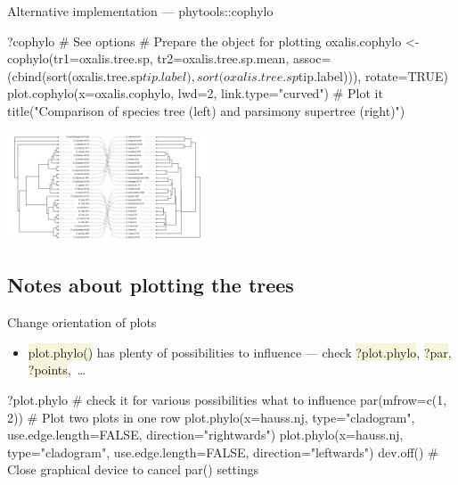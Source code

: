 \documentclass[compress, xelatex, 11pt, xcolor=svgnames, aspectratio=169,
	hyperref={
		bookmarks=true,
		unicode=true,
		colorlinks=true,
		pdftitle={Molecular data in R},
		plainpages=false,
		pdfauthor={Vojtech Zeisek},
		pdfsubject={Course about phylogeny and evolution in R},
		pdfcreator={XeLaTeX},
		pdfkeywords={R, evolution, phylogeny, molecular data},
		linkcolor=Crimson, %
		anchorcolor=Magenta, %
		citecolor=Magenta, %
		filecolor=Magenta, %
		menucolor=Magenta, %
		urlcolor=DodgerBlue, %
		},
	url={hyphens, lowtilde} %
	]{beamer}
\renewcommand{\texttt}[1]{\colorbox{Beige}{{\ttfamily #1}}}
\begin{document}
\begin{frame}[fragile]{Alternative implementation --- phytools::cophylo}
	\begin{spluscode}
    ?cophylo # See options
    # Prepare the object for plotting
    oxalis.cophylo <- cophylo(tr1=oxalis.tree.sp, tr2=oxalis.tree.sp.mean,
      assoc=(cbind(sort(oxalis.tree.sp$tip.label),
      sort(oxalis.tree.sp$tip.label))), rotate=TRUE)
    plot.cophylo(x=oxalis.cophylo, lwd=2, link.type="curved") # Plot it
    title("Comparison of species tree (left) and parsimony supertree (right)")
	\end{spluscode}
	\begin{center}
		\includegraphics[height=3.25cm]{cophylo.png}
	\end{center}
\end{frame}

\subsection{Notes about plotting the trees}

\begin{frame}[fragile]{Change orientation of plots}
	\begin{itemize}
		\item \alert{\texttt{plot.phylo()} has plenty of possibilities to influence --- check \texttt{?plot.phylo}, \texttt{?par}, \texttt{?points},~\ldots}
	\end{itemize}
	\begin{spluscode}
    ?plot.phylo # check it for various possibilities what to influence
    par(mfrow=c(1, 2)) # Plot two plots in one row
    plot.phylo(x=hauss.nj, type="cladogram", use.edge.length=FALSE,
      direction="rightwards")
    plot.phylo(x=hauss.nj, type="cladogram", use.edge.length=FALSE,
      direction="leftwards")
    dev.off() # Close graphical device to cancel par() settings
	\end{spluscode}
	\begin{center}
		\texttt{[image: lr.png]}
	\end{center}
\end{frame}
\end{document}
